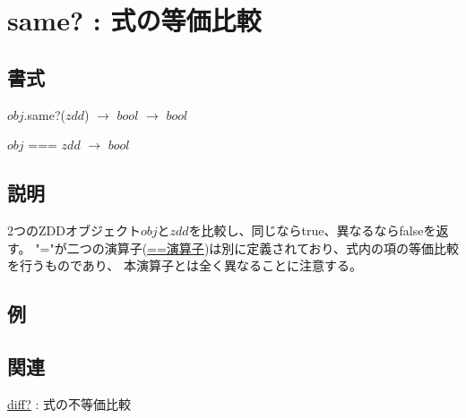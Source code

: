 
\section{same? : 式の等価比較\label{sect:same?}}
\subsection*{書式}
$obj$.same?($zdd$)  $\rightarrow$ $bool$ $\rightarrow$ $bool$

$obj$ === $zdd$ $\rightarrow$ $bool$

\subsection*{説明}
2つのZDDオブジェクト$obj$と$zdd$を比較し、同じならtrue、異なるならfalseを返す。
"="が二つの演算子(\hyperref[sect:eq]{==演算子})は別に定義されており、式内の項の等価比較を行うものであり、
本演算子とは全く異なることに注意する。

\subsection*{例}


\subsection*{関連}
\hyperref[sect:diff?]{diff?} : 式の不等価比較



